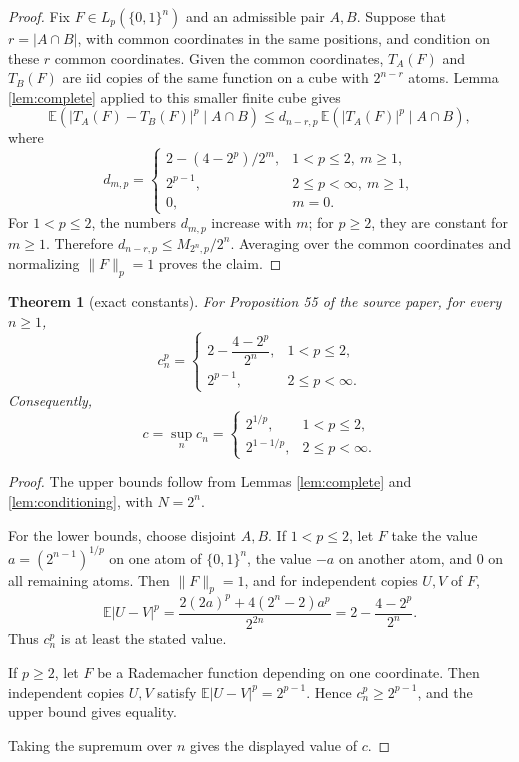 \documentclass[11pt]{article}
\newtheorem{theorem}{Theorem}
\newcommand{\E}{\mathbb E}
\begin{document}
\begin{proof}
Fix \(F\in L_p(\{0,1\}^n)\) and an admissible pair \(A,B\).  Suppose that
\(r=|A\cap B|\), with common coordinates in the same positions, and condition
on these \(r\) common coordinates.  Given the common coordinates,
\(T_A(F)\) and \(T_B(F)\) are iid copies of the same function on a cube with
\(2^{n-r}\) atoms.  Lemma \ref{lem:complete} applied to this smaller finite
cube gives
\[
 \E\left(|T_A(F)-T_B(F)|^p\mid A\cap B\right)
 \leq d_{n-r,p}\,
 \E\left(|T_A(F)|^p\mid A\cap B\right),
\]
where
\[
d_{m,p}=
\begin{cases}
2-(4-2^p)/2^m, & 1<p\leq2,\ m\geq1,\\
2^{p-1}, & 2\leq p<\infty,\ m\geq1,\\
0, & m=0.
\end{cases}
\]
For \(1<p\leq2\), the numbers \(d_{m,p}\) increase with \(m\); for
\(p\geq2\), they are constant for \(m\geq1\).  Therefore
\(d_{n-r,p}\leq M_{2^n,p}/2^n\).  Averaging over the common coordinates and
normalizing \(\|F\|_p=1\) proves the claim.
\end{proof}

\begin{theorem}[exact constants]\label{thm:constants}
For Proposition 55 of the source paper, for every \(n\geq1\),
\[
 c_n^p =
 \begin{cases}
 2-\dfrac{4-2^p}{2^n}, & 1<p\leq2,\\[6pt]
 2^{p-1}, & 2\leq p<\infty.
 \end{cases}
\]
Consequently,
\[
 c=\sup_n c_n =
 \begin{cases}
 2^{1/p}, & 1<p\leq2,\\
 2^{1-1/p}, & 2\leq p<\infty.
 \end{cases}
\]
\end{theorem}

\begin{proof}
The upper bounds follow from Lemmas \ref{lem:complete} and
\ref{lem:conditioning}, with \(N=2^n\).

For the lower bounds, choose disjoint \(A,B\).  If \(1<p\leq2\), let \(F\) take
the value \(a=(2^{n-1})^{1/p}\) on one atom of \(\{0,1\}^n\), the value \(-a\)
on another atom, and \(0\) on all remaining atoms.  Then \(\|F\|_p=1\), and
for independent copies \(U,V\) of \(F\),
\[
\E|U-V|^p
 =\frac{2(2a)^p+4(2^n-2)a^p}{2^{2n}}
 =2-\frac{4-2^p}{2^n}.
\]
Thus \(c_n^p\) is at least the stated value.

If \(p\geq2\), let \(F\) be a Rademacher function depending on one coordinate.
Then independent copies \(U,V\) satisfy \(\E|U-V|^p=2^{p-1}\).  Hence
\(c_n^p\geq2^{p-1}\), and the upper bound gives equality.

Taking the supremum over \(n\) gives the displayed value of \(c\).
\end{proof}
\end{document}
